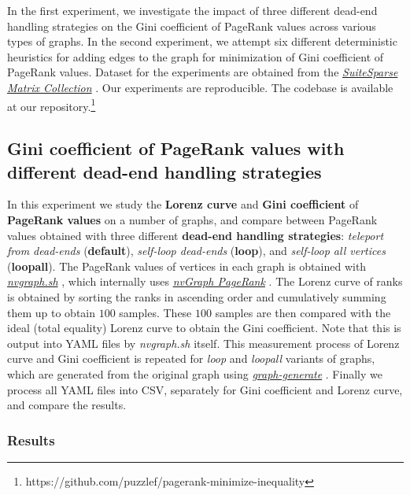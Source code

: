 In the first experiment, we investigate the impact of three different dead-end handling strategies on the Gini coefficient of PageRank values across various types of graphs. In the second experiment, we attempt six different deterministic heuristics for adding edges to the graph for minimization of Gini coefficient of PageRank values. Dataset for the experiments are obtained from the \href{https://sparse.tamu.edu}{\textit{SuiteSparse Matrix Collection}} \cite{suite19}. Our experiments are reproducible. The codebase is available at our repository.\footnote{https://github.com/puzzlef/pagerank-minimize-inequality}




\subsection{Gini coefficient of PageRank values with different dead-end handling strategies}

In this experiment we study the \textbf{Lorenz curve} and \textbf{Gini coefficient} of \textbf{PageRank values} on a number of graphs, and compare between PageRank values obtained with three different \textbf{dead-end handling strategies}: \textit{teleport from dead-ends} (\textbf{default}), \textit{self-loop dead-ends} (\textbf{loop}), and \textit{self-loop all vertices} (\textbf{loopall}). The PageRank values of vertices in each graph is obtained with \href{https://www.npmjs.com/package/nvgraph.sh}{\textit{nvgraph.sh}} \cite{sahu2021nvgraph}, which internally uses \href{https://docs.nvidia.com/cuda/archive/10.0/nvgraph/index.html#nvgraph-pagerank-example}{\textit{nvGraph PageRank}} \cite{nvidia2018nvgraph}. The Lorenz curve of ranks is obtained by sorting the ranks in ascending order and cumulatively summing them up to obtain $100$ samples. These $100$ samples are then compared with the ideal (total equality) Lorenz curve to obtain the Gini coefficient. Note that this is output into YAML files by \textit{nvgraph.sh} itself. This measurement process of Lorenz curve and Gini coefficient is repeated for \textit{loop} and \textit{loopall} variants of graphs, which are generated from the original graph using \href{https://github.com/puzzlef/graph-generate}{\textit{graph-generate}} \cite{sahu2022github}. Finally we process all YAML files into CSV, separately for Gini coefficient and Lorenz curve, and compare the results.





\subsubsection{Results}


